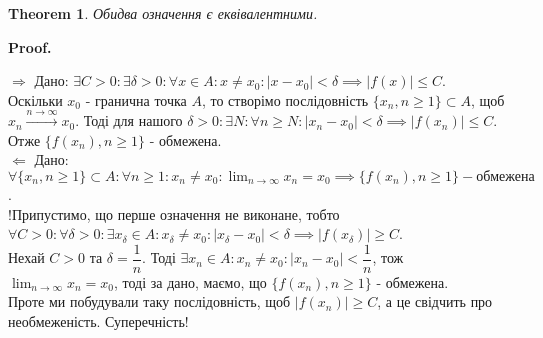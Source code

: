 \documentclass[a4paper, 14pt]{article}
\makeatletter
\def\qed{$\blacksquare$}
\def\rightproof{$\boxed{\Rightarrow}$ }
\def\leftproof{$\boxed{\Leftarrow}$ }
\theoremstyle{theoremdd}
\newtheorem{theorem}{Theorem}[subsection]
\theoremstyle{theoremdd}
\theoremstyle{theoremdd}
\theoremstyle{theoremdd}
\theoremstyle{theoremdd}
\theoremstyle{theoremdd}
\theoremstyle{theoremdd}
\theoremstyle{theoremdd}
\renewenvironment{proof}[1][Proof.\\]{\par
\pushQED{\hfill \qed}%
\normalfont \topsep6\p@\@plus6\p@\relax
\trivlist
\item\relax
{\bfseries
#1\@addpunct{.}}\hspace\labelsep\ignorespaces
}{%
\popQED\endtrivlist\@endpefalse
}
\makeatother
\begin{document}
	\begin{theorem}
	Обидва означення є еквівалентними.
	\end{theorem}
	
	\begin{proof}
	\rightproof Дано: $\exists C > 0: \exists \delta > 0: \forall x \in A: x \neq x_0: |x-x_0|<\delta \implies |f(x)| \leq C$.\\
	Оскільки $x_0$ - гранична точка $A$, то створімо послідовність $\{x_n, n \geq 1\} \subset A$, щоб $x_n \overset{n \to \infty}{\longrightarrow} x_0$. Тоді для нашого $\delta > 0: \exists N: \forall n \geq N: |x_n-x_0|<\delta \implies |f(x_n)| \leq C$. Отже $\{f(x_n), n \geq 1\}$ - обмежена.
	\bigskip \\
	\leftproof Дано: $\forall \{x_n, n \geq 1\} \subset A: \forall n \geq 1: x_n \neq x_0: \displaystyle \lim_{n \to \infty} x_n = x_0 \implies \{f(x_n), n \geq 1\} - \text{обмежена}$.\\
	!Припустимо, що перше означення не виконане, тобто \\ $\forall C > 0: \forall \delta > 0: \exists x_{\delta} \in A: x_{\delta} \neq x_0: |x_{\delta} - x_0| < \delta \implies |f(x_{\delta})| \geq C$.\\
	Нехай $C > 0$ та $\delta = \dfrac{1}{n}$. Тоді $\exists x_n \in A: x_n \neq x_0: |x_n-x_0|<\dfrac{1}{n}$, тож $\displaystyle\lim_{n \to \infty} x_n = x_0$, тоді за дано, маємо, що $\{f(x_n), n \geq 1\}$ - обмежена.\\
	Проте ми побудували таку послідовність, щоб $|f(x_n)| \geq C$, а це свідчить про необмеженість. Суперечність!
	\end{proof}
	
\end{document}

